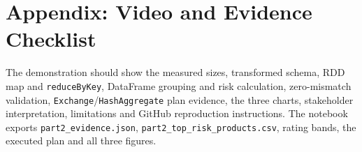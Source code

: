 \documentclass[10pt,a4paper]{article}
\begin{document}
\section*{Appendix: Video and Evidence Checklist}
The demonstration should show the measured sizes, transformed schema, RDD map and \texttt{reduceByKey}, DataFrame grouping and risk calculation, zero-mismatch validation, \texttt{Exchange}/\texttt{HashAggregate} plan evidence, the three charts, stakeholder interpretation, limitations and GitHub reproduction instructions. The notebook exports \texttt{part2\_evidence.json}, \texttt{part2\_top\_risk\_products.csv}, rating bands, the executed plan and all three figures.
\end{document}
